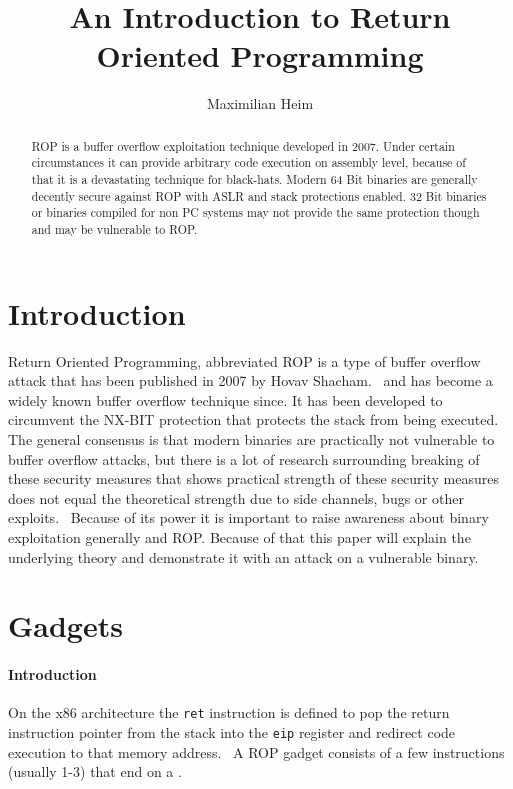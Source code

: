 \documentclass[journal=tosc,submission, notanonymous]{iacrtrans}
\author{Maximilian Heim\inst{1}}
\institute{
  University Albstadt-Sigmaringen, Albstadt, Germany, \email{MaximilianHeim@protonmail.com}
}
\title{An Introduction to Return Oriented Programming}
\begin{document}
\maketitle




\begin{abstract}
ROP is a buffer overflow exploitation technique developed in 2007. Under certain circumstances it can provide arbitrary code execution on assembly level, because of that it is a devastating technique for black-hats. Modern 64 Bit binaries are generally decently secure against ROP with ASLR and stack protections enabled. 32 Bit binaries or binaries compiled for non PC systems may not provide the same protection though and may be vulnerable to ROP. 
\end{abstract}

\section{Introduction}
Return Oriented Programming, abbreviated ROP is a type of buffer overflow attack that has been published in 2007 by Hovav Shacham.~\cite{ropfirstpaper} and has become a widely known buffer overflow technique since. It has been developed to circumvent the NX-BIT protection that protects the stack from being executed. The general consensus is that modern binaries are practically not vulnerable to buffer overflow attacks, but there is a lot of research surrounding breaking of these security measures that shows practical strength of these security measures does not equal the theoretical strength due to side channels, bugs or other exploits.~\cite{aslr} Because of its power it is important to raise awareness about binary exploitation generally and ROP. Because of that this paper will explain the underlying theory and demonstrate it with an attack on a vulnerable binary.


\section{Gadgets}
\label{sec:gadgets}
\paragraph{Introduction}
On the x86 architecture the \Verb+ret+ instruction is defined to pop the return instruction pointer from the stack into the \Verb+eip+ register and redirect code execution to that memory address.~\cite{retx86} A ROP gadget consists of a few instructions (usually 1-3) that end on a .
\end{document}
